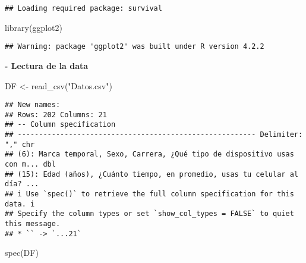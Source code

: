 \documentclass[
]{article}
\newenvironment{Shaded}{\begin{snugshade}}{\end{snugshade}}
\newcommand{\FunctionTok}[1]{\textcolor[rgb]{0.00,0.00,0.00}{#1}}
\newcommand{\NormalTok}[1]{#1}
\newcommand{\OtherTok}[1]{\textcolor[rgb]{0.56,0.35,0.01}{#1}}
\newcommand{\StringTok}[1]{\textcolor[rgb]{0.31,0.60,0.02}{#1}}
\begin{document}
\begin{verbatim}
## Loading required package: survival
\end{verbatim}

\begin{Shaded}
\begin{Highlighting}[]
\FunctionTok{library}\NormalTok{(ggplot2)}
\end{Highlighting}
\end{Shaded}

\begin{verbatim}
## Warning: package 'ggplot2' was built under R version 4.2.2
\end{verbatim}

\textbf{- Lectura de la data}

\begin{Shaded}
\begin{Highlighting}[]
\NormalTok{DF }\OtherTok{\textless{}{-}} \FunctionTok{read\_csv}\NormalTok{(}\StringTok{"Datos.csv"}\NormalTok{)}
\end{Highlighting}
\end{Shaded}

\begin{verbatim}
## New names:
## Rows: 202 Columns: 21
## -- Column specification
## -------------------------------------------------------- Delimiter: "," chr
## (6): Marca temporal, Sexo, Carrera, ¿Qué tipo de dispositivo usas con m... dbl
## (15): Edad (años), ¿Cuánto tiempo, en promedio, usas tu celular al día? ...
## i Use `spec()` to retrieve the full column specification for this data. i
## Specify the column types or set `show_col_types = FALSE` to quiet this message.
## * `` -> `...21`
\end{verbatim}

\begin{Shaded}
\begin{Highlighting}[]
\FunctionTok{spec}\NormalTok{(DF)}
\end{Highlighting}
\end{Shaded}
\end{document}

